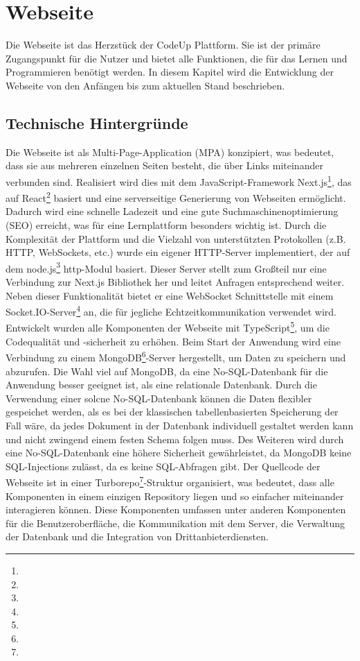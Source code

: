 \documentclass{subfiles}
\begin{document}
\chapter{Webseite}\label{ch:website}
Die Webseite ist das Herzstück der CodeUp Plattform.
Sie ist der primäre Zugangspunkt für die Nutzer und bietet alle Funktionen, die für das Lernen und Programmieren benötigt werden.
In diesem Kapitel wird die Entwicklung der Webseite von den Anfängen bis zum aktuellen Stand beschrieben.

\section{Technische Hintergründe}\label{sec:website-tech}
Die Webseite ist als Multi-Page-Application (MPA) konzipiert, was bedeutet, dass sie aus mehreren einzelnen Seiten besteht, die über Links miteinander verbunden sind.
Realisiert wird dies mit dem JavaScript-Framework Next.js\footnote{}, das auf React\footnote{} basiert und eine serverseitige Generierung von Webseiten ermöglicht.
Dadurch wird eine schnelle Ladezeit und eine gute Suchmaschinenoptimierung (SEO) erreicht, was für eine Lernplattform besonders wichtig ist.
Durch die Komplexität der Plattform und die Vielzahl von unterstützten Protokollen (z.B. HTTP, WebSockets, etc.) wurde ein eigener HTTP-Server implementiert,
der auf dem node.js\footnote{} \dq http\dq-Modul basiert.
Dieser Server stellt zum Großteil nur eine Verbindung zur Next.js Bibliothek her und leitet Anfragen entsprechend weiter.
Neben dieser Funktionalität bietet er eine WebSocket Schnittstelle mit einem Socket.IO-Server\footnote{} an, die für jegliche Echtzeitkommunikation verwendet wird.
Entwickelt wurden alle Komponenten der Webseite mit TypeScript\footnote{}, um die Codequalität und -sicherheit zu erhöhen.
Beim Start der Anwendung wird eine Verbindung zu einem MongoDB\footnote{}-Server hergestellt, um Daten zu speichern und abzurufen.
Die Wahl viel auf MongoDB, da eine No-SQL-Datenbank für die Anwendung besser geeignet ist, als eine relationale Datenbank.
Durch die Verwendung einer solcne No-SQL-Datenbank können die Daten flexibler gespeichet werden, als es bei der klassischen tabellenbasierten Speicherung der Fall wäre,
da jedes Dokument in der Datenbank individuell gestaltet werden kann und nicht zwingend einem festen Schema folgen muss.
Des Weiteren wird durch eine No-SQL-Datenbank eine höhere Sicherheit gewährleistet, da MongoDB keine SQL-Injections zulässt, da es keine SQL-Abfragen gibt.
Der Quellcode der Webseite ist in einer Turborepo\footnote{}-Struktur organisiert, was bedeutet, dass alle Komponenten in einem einzigen Repository liegen
und so einfacher miteinander interagieren können.
Diese Komponenten umfassen unter anderen Komponenten für die Benutzeroberfläche, die Kommunikation mit dem Server, die Verwaltung der Datenbank und die Integration von Drittanbieterdiensten.
\end{document}
